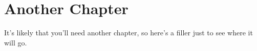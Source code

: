 \chapter{Another Chapter}

It's likely that you'll need another chapter, so here's a filler just to see
where it will go.
